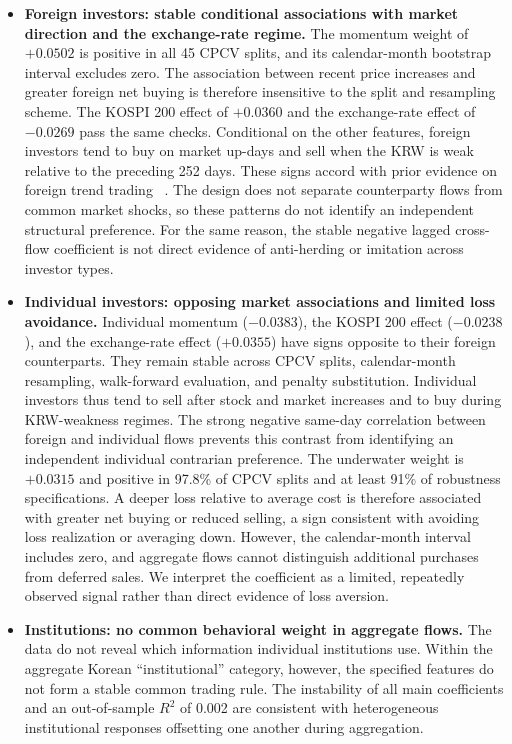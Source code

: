 \begin{itemize}
\item \textbf{Foreign investors: stable conditional associations with market direction
and the exchange-rate regime.} The momentum weight of $+0.0502$ is positive in all
45 CPCV splits, and its calendar-month bootstrap interval excludes zero. The association
between recent price increases and greater foreign net buying is therefore insensitive to
the split and resampling scheme. The KOSPI 200 effect of $+0.0360$ and the exchange-rate
effect of $-0.0269$ pass the same checks. Conditional on the other features, foreign
investors tend to buy on market up-days and sell when the KRW is weak relative to the
preceding 252 days. These signs accord with prior evidence on foreign trend trading
~\cite{grinblatt2000investment,choe1999foreign}. The design does not separate counterparty
flows from common market shocks, so these patterns do not identify an independent
structural preference. For the same reason, the stable negative lagged cross-flow
coefficient is not direct evidence of anti-herding or imitation across investor types.

\item \textbf{Individual investors: opposing market associations and limited loss
avoidance.} Individual momentum ($-0.0383$), the KOSPI 200 effect
($-0.0238$), and the exchange-rate effect ($+0.0355$) have signs opposite to their
foreign counterparts. They remain stable across CPCV splits, calendar-month resampling,
walk-forward evaluation, and penalty substitution. Individual investors thus tend to sell
after stock and market increases and to buy during KRW-weakness regimes. The strong negative
same-day correlation between foreign and individual flows prevents this contrast from
identifying an independent individual contrarian preference. The underwater weight is
$+0.0315$ and positive in 97.8\% of CPCV splits and at least 91\% of robustness
specifications. A deeper loss relative to average cost is therefore associated with greater
net buying or reduced selling, a sign consistent with avoiding loss realization or averaging
down. However, the calendar-month interval includes zero, and aggregate flows cannot
distinguish additional purchases from deferred sales. We interpret the coefficient as a
limited, repeatedly observed signal rather than direct evidence of loss aversion.

\item \textbf{Institutions: no common behavioral weight in aggregate flows.} The data do
not reveal which information individual institutions use. Within the aggregate Korean
``institutional'' category, however, the specified features do not form a stable common
trading rule. The instability of all main coefficients and an out-of-sample $R^2$ of 0.002
are consistent with heterogeneous institutional responses offsetting one another during
aggregation.
\end{itemize}

